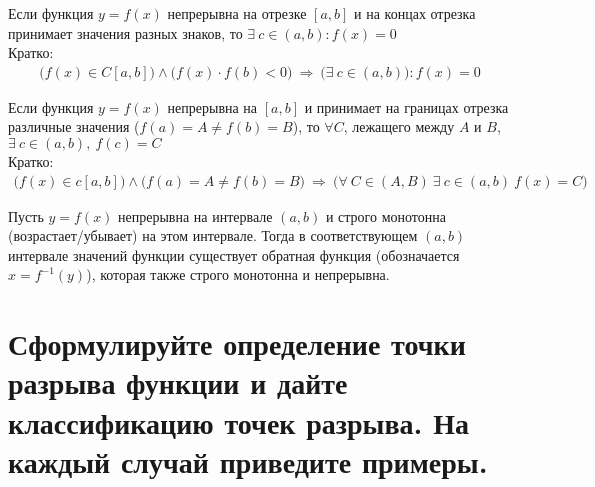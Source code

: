 \begin{theorem}
  Если функция $y = f(x)$ непрерывна на отрезке $[a, b]$ и на концах отрезка принимает значения разных знаков, то $\exists\ c \in (a, b)\colon f(x) = 0$\\
  Кратко: \vspace{-\topsep}
  \begin{gather*}
    \big(f(x) \in C[a, b]\big) \wedge \big(f(x) \cdot f(b)< 0\big)\ \Rightarrow\ \big(\exists\ c \in (a, b)\big)\colon f(x) = 0
  \end{gather*}
\end{theorem}
\begin{theorem}
  Если функция $y = f(x)$ непрерывна на $[a, b]$ и принимает на границах отрезка различные значения ($f(a) = A \ne f(b) = B$), то $\forall C$, лежащего между $A$ и $B$, $\exists\ c \in (a, b),\ f(c) = C$\\
  Кратко: \vspace{-\topsep}
  \begin{gather*}
    \big(f(x) \in c[a, b]\big) \wedge \big(f(a) = A \ne f(b) = B\big)\ \Rightarrow\ \big(\forall\ C \in (A, B)\ \exists\ c \in (a, b)\ f(x) = C\big)
  \end{gather*}
\end{theorem}
\begin{theorem}
  Пусть $y = f(x)$ непрерывна на интервале $(a, b)$ и строго монотонна (возрастает/убывает) на этом интервале. Тогда в соответствующем $(a, b)$ интервале значений функции существует обратная функция \big(обозначается $x = f^{-1}(y)$\big), которая также строго монотонна и непрерывна.
\end{theorem}
\newpage
\section{Сформулируйте определение точки разрыва функции и дайте классификацию точек разрыва. На каждый случай приведите примеры.}

